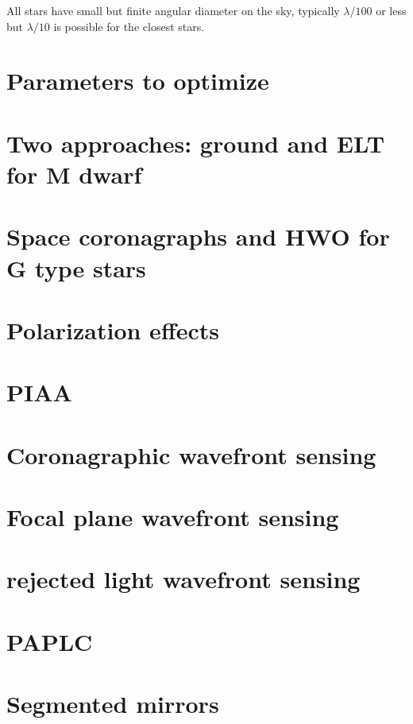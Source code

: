 \documentclass[letterpaper]{ar-1col}
\begin{document}
All stars have small but finite angular diameter on the sky, typically $\lambda/100$ or less but $\lambda/10$ is possible for the closest stars.
%




\lipsum[2-4]

\section{Parameters to optimize}
\lipsum[2-4]

\section{Two approaches: ground and ELT for M dwarf}
\lipsum[2-4]

\section{Space coronagraphs and HWO for G type stars}
\lipsum[2-4]

\section{Polarization effects} 
\lipsum[2-4]

\section{PIAA}
\lipsum[2-4]

\section{Coronagraphic wavefront sensing}
\lipsum[2-4]

\section{Focal plane wavefront sensing}
\lipsum[2-4]

\section{rejected light wavefront sensing} 
\lipsum[2-4]

\section{PAPLC}
\lipsum[2-4]

\section{Segmented mirrors}
\lipsum[2-4]
\end{document}
